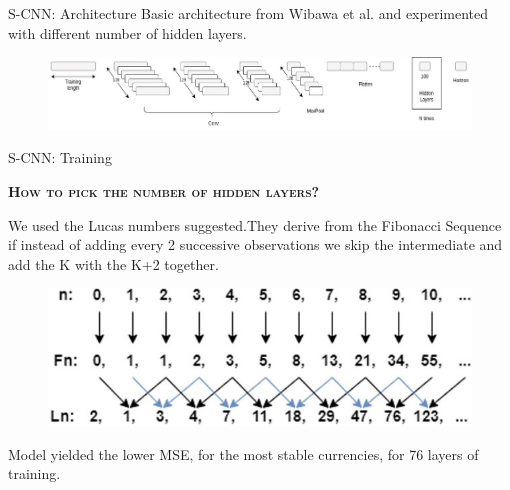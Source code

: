 \documentclass[aspectratio=169, 12pt]{beamer}
\begin{document}
\begin{frame}{S-CNN: Architecture}
Basic architecture from Wibawa et al.\cite{e-cnn} and experimented with different number of hidden layers.
\begin{figure}[htbp]
\centering
\includegraphics[width=\columnwidth]{./plots/s-cnn.jpg}
\end{figure}
\end{frame}

\begin{frame}[allowframebreaks]{S-CNN: Training}
    \begin{center}
    \textsc{\textbf{How to pick the number of hidden layers?}}
    \end{center}
    We used the Lucas numbers suggested.They derive from the Fibonacci Sequence if instead of adding every 2 successive observations we skip the intermediate and add the K with the K+2 together.
    \begin{figure}[htbp]
    \centering
    \includegraphics[width=0.6\columnwidth]{./plots/fibonacci.jpg}
    \end{figure}

Model yielded the lower MSE, for the most stable currencies, for 76 layers of training.


\end{frame}
\end{document}
